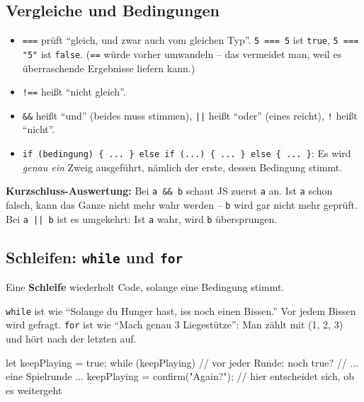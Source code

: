 \documentclass[a4paper,11pt]{article}
\begin{document}
\subsection{Vergleiche und Bedingungen}

\begin{itemize}[nosep]
\item \lstinline|===| prüft "`gleich, und zwar auch vom gleichen Typ"'. \lstinline|5 === 5| ist \lstinline|true|,
      \lstinline|5 === "5"| ist \lstinline|false|. (\lstinline|==| würde vorher umwandeln -- das vermeidet man,
      weil es überraschende Ergebnisse liefern kann.)
\item \lstinline|!==| heißt "`nicht gleich"'.
\item \lstinline|&&| heißt "`und"' (beides muss stimmen), \lstinline!||! heißt "`oder"' (eines reicht),
      \lstinline|!| heißt "`nicht"'.
\item \lstinline|if (bedingung) { ... } else if (...) { ... } else { ... }|: Es wird \emph{genau ein} Zweig
      ausgeführt, nämlich der erste, dessen Bedingung stimmt.
\end{itemize}

\textbf{Kurzschluss-Auswertung:} Bei \lstinline|a && b| schaut JS zuerst \texttt{a} an. Ist \texttt{a} schon falsch,
kann das Ganze nicht mehr wahr werden -- \texttt{b} wird gar nicht mehr geprüft. Bei \lstinline!a || b! ist es umgekehrt:
Ist \texttt{a} wahr, wird \texttt{b} übersprungen.

\subsection{Schleifen: \texttt{while} und \texttt{for}}

Eine \textbf{Schleife} wiederholt Code, solange eine Bedingung stimmt.

\begin{analogie}
\texttt{while} ist wie "`Solange du Hunger hast, iss noch einen Bissen."' Vor jedem Bissen wird gefragt.
\texttt{for} ist wie "`Mach genau 3 Liegestütze"': Man zählt mit (1, 2, 3) und hört nach der letzten auf.
\end{analogie}

\begin{code}
let keepPlaying = true;
while (keepPlaying) {                 // vor jeder Runde: noch true?
    // ... eine Spielrunde ...
    keepPlaying = confirm("Again?");  // hier entscheidet sich, ob es weitergeht
}
\end{code}
\end{document}
